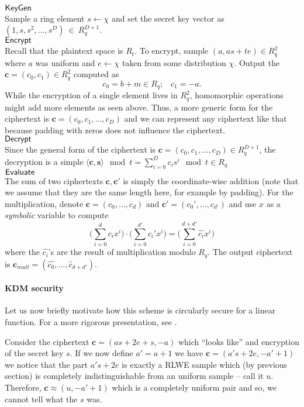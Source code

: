 \begin{mdframed}
	$\textsf{KeyGen}$\\
	Sample a ring element $s \leftarrow \chi$ and set the secret key vector as $(1, s, s^2, \ldots, s^D)~\in~R_q^{D+1}$. \\
	$\textsf{Encrypt}$\\
	Recall that the plaintext space is $R_t$. To encrypt, sample $(a, as +te) \in R_q^2$ where $a$ was uniform and $e \leftarrow \chi$ taken from some distribution $\chi$. Output the $\bm{c} = (c_0, c_1) \in R_q^2$ computed as
	\[c_0 = b +m \in R_q; \; \; \; c_1 = -a.  \]
	While the encryption of a single element lives in $R_q^2$, homomorphic operations might add more elements as seen above. Thus, a more generic form for the ciphertext is $\bm{c} = (c_0, c_1, \ldots, c_D)$ and we can represent any ciphertext like that because padding with zeros does not influence the ciphertext.
	\\
	$\textsf{Decrypt}$\\
	Since the general form of the ciphertext is $\bm{c} = (c_0, c_1, \ldots, c_D) \in R_q^{D+1}$, the decryption is a simple $\langle \bm{c, s} \rangle \mod t = \sum_{i = 0}^D c_i s^i \mod t \in R_q$ \\
	$\textsf{Evaluate}$\\
	The sum of two ciphertexts $\bm{c, c'}$ is simply the coordinate-wise addition (note that we assume that they are the same length here, for example by padding). For the multiplication, denote $\bm{c} = (c_0, \ldots, c_d)$ and $\bm{c'} = (c_0', \ldots, c_{d'})$ and use $x$ as a \textit{symbolic} variable to compute
	\[ \bigg( \sum_{i = 0}^d c_ix^i \bigg) \cdot \bigg(\sum_{i = 0}^{d'} c_i'x^i \bigg) =
	\bigg( \sum_{i = 0}^{d+d'} \hat{c_i}x^i \bigg) \]
	where the $\hat{c_i}$'s are the result of multiplication modulo $R_q$. The output ciphertext is $\bm{c}_{mult} = (\hat{c_0}, \ldots, \hat{c}_{d+d'})$.

\end{mdframed}

\paragraph{KDM security}
Let us now briefly motivate how this scheme is circularly secure for a linear function. For a more rigorous presentation, see \cite{fhe_rlwe}.

Consider the ciphertext $\bm{c}= (as +2e +s, -a)$ which ``looks like'' and encryption of the secret key $s$. If we now define $a' = a +1$ we have $\bm{c} = (a's +2e, -a'+1)$ we notice that the part $a's+2e$ is exactly a RLWE sample which (by previous section) is completely indistinguishable from an uniform sample -- call it $u$. Therefore, $\bm{c} \approx (u, -a'+1)$ which is a completely uniform pair and so, we cannot tell what the $s$ was.


